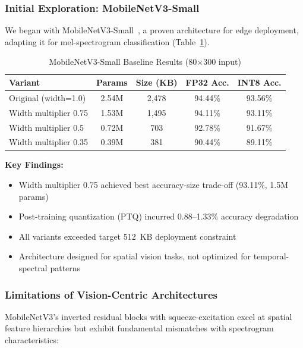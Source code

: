 \documentclass[conference]{IEEEtran}
\begin{document}
\subsubsection{Initial Exploration: MobileNetV3-Small}

We began with MobileNetV3-Small~\cite{howard2019searching}, a proven architecture for edge deployment, adapting it for mel-spectrogram classification (Table~\ref{tab:mobilenet_baseline}).

\begin{table}[h]
\centering
\caption{MobileNetV3-Small Baseline Results (80$\times$300 input)}
\label{tab:mobilenet_baseline}
\begin{tabular}{lcccc}
\toprule
\textbf{Variant} & \textbf{Params} & \textbf{Size (KB)} & \textbf{FP32 Acc.} & \textbf{INT8 Acc.} \\
\midrule
Original (width=1.0) & 2.54M & 2,478 & 94.44\% & 93.56\% \\
Width multiplier 0.75 & 1.53M & 1,495 & 94.11\% & 93.11\% \\
Width multiplier 0.5 & 0.72M & 703 & 92.78\% & 91.67\% \\
Width multiplier 0.35 & 0.39M & 381 & 90.44\% & 89.11\% \\
\bottomrule
\end{tabular}
\end{table}

\noindent\textbf{Key Findings:}
\begin{itemize}
    \item Width multiplier 0.75 achieved best accuracy-size trade-off (93.11\%, 1.5M params)
    \item Post-training quantization (PTQ) incurred 0.88--1.33\% accuracy degradation
    \item All variants exceeded target 512~KB deployment constraint
    \item Architecture designed for spatial vision tasks, not optimized for temporal-spectral patterns
\end{itemize}

\subsubsection{Limitations of Vision-Centric Architectures}

MobileNetV3's inverted residual blocks with squeeze-excitation excel at spatial feature hierarchies but exhibit fundamental mismatches with spectrogram characteristics:
\end{document}
